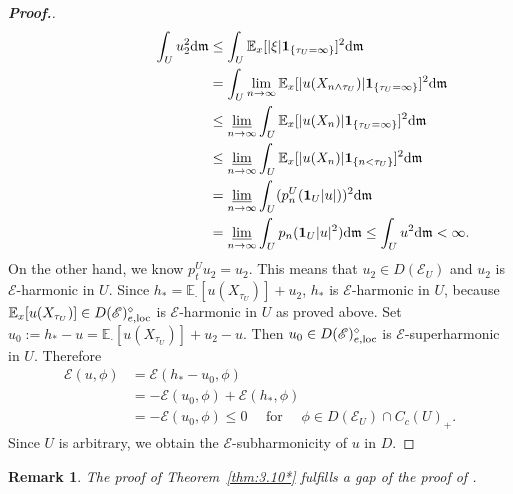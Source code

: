 \documentclass[12pt,a4paper]{article}
\newtheorem{remark}[thm]{Remark}
\renewcommand{\d}{\mathrm{d}}
\newcommand{\m}{\mathfrak{m} }
\newcommand{\loc}{{\rm loc}}
\newcommand{\1}{{\bf 1}}
\begin{document}
\begin{proof}[{\bf Proof.}]
\begin{align*}
\int_Uu_2^2{\d}{\m}&\leq \int_U\mathbb{E}_x[|\xi|\1_{\{\tau_U=\infty\}}]^2{\d}{\m}\\
&=\int_U\lim_{n\to\infty}\mathbb{E}_x[|u(X_{n\land\tau_U})|
\1_{\{\tau_U=\infty\}}]^2{\d}{\m}
\\
&\leq\varliminf_{n\to\infty}\int_U\mathbb{E}_x[|u(X_n)|\1_{\{\tau_U=\infty\}}]^2{\d}{\m}
\\
\hspace{4cm}&\leq\varliminf_{n\to\infty}\int_U\mathbb{E}_x[|u(X_n)|\1_{\{n<\tau_U\}}]^2{\d}{\m}
\\
&=\varliminf_{n\to\infty}\int_U(p_n^U(\1_U|u|))^2{\d}{\m}\\
&
=\varliminf_{n\to\infty}\int_Up_n(\1_U|u|^2){\d}{\m}\leq\int_Uu^2{\d}{\m}<\infty.
\end{align*}
On the other hand, we know $p_t^Uu_2=u_2$. This means that 
$u_2\in D(\mathscr{E}_U)$ and $u_2$ is $\mathscr{E}$-harmonic in $U$.
Since $h_*=\mathbb{E}_{\cdot}[u(X_{\tau_U})]+u_2$, $h_*$ is $\mathscr{E}$-harmonic in $U$, because $\mathbb{E}_x[u(X_{\tau_U})]\in D(\mathscr{E})_{e,\loc}^{\diamond}$ is $\mathscr{E}$-harmonic in $U$ as proved above.  
Set $u_0:=h_*-u=\mathbb{E}_{\cdot}[u(X_{\tau_U})]+u_2-u$. Then 
$u_0\in D(\mathscr{E})_{e,\loc}^{\diamond}$ is $\mathscr{E}$-superharmonic in $U$. 
Therefore 
\begin{align*}
\mathscr{E}(u,\phi)&=\mathscr{E}(h_*-u_0,\phi)\\
&=-\mathscr{E}(u_0,\phi)+\mathscr{E}(h_*,\phi)\\
&=-\mathscr{E}(u_0,\phi)\leq0\quad\text{ for }\quad \phi\in D(\mathscr{E}_U)\cap C_c(U)_+.
\end{align*}
Since $U$ is arbitrary, we obtain the $\mathscr{E}$-subharmonicity of $u$ in $D$.
\end{proof}
\begin{remark}
{\rm The proof of Theorem~\ref{thm:3.10*}
fulfills a gap of the proof of \cite[Theorem~3.12]{CK}. 
}
\end{remark}
\end{document}
